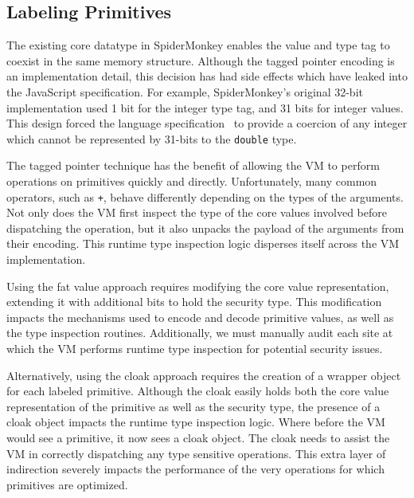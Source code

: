 \documentclass[11pt,onecolumn]{article}
\begin{document}
\subsection{Labeling Primitives}\label{sec:primitives}

The existing core datatype in SpiderMonkey enables the value and type tag to coexist in the same memory structure.
Although the tagged pointer encoding is an implementation detail, this decision has had side effects which have leaked into the JavaScript specification.
For example, SpiderMonkey's original 32-bit implementation used 1 bit for the integer type tag, and 31 bits for integer values.
This design forced the language specification~\cite{ecma} to provide a coercion of any integer which cannot be represented by 31-bits to the \texttt{double} type.

The tagged pointer technique has the benefit of allowing the VM to perform operations on primitives quickly and directly.
Unfortunately, many common operators, such as \texttt{+}, behave differently depending on the types of the arguments.
Not only does the VM first inspect the type of the core values involved before dispatching the operation, but it also unpacks the payload of the arguments from their encoding.
This runtime type inspection logic disperses itself across the VM implementation.

Using the fat value approach requires modifying the core value representation, extending it with additional bits to hold the security type.
This modification impacts the mechanisms used to encode and decode primitive values, as well as the type inspection routines.
Additionally, we must manually audit each site at which the VM performs runtime type inspection for potential security issues.

Alternatively, using the cloak approach requires the creation of a wrapper object for each labeled primitive.
Although the cloak easily holds both the core value representation of the primitive as well as the security type, the presence of a cloak object impacts the runtime type inspection logic.
Where before the VM would see a primitive, it now sees a cloak object.
The cloak needs to assist the VM in correctly dispatching any type sensitive operations.
This extra layer of indirection severely impacts the performance of the very operations for which primitives are optimized.

\end{document}
